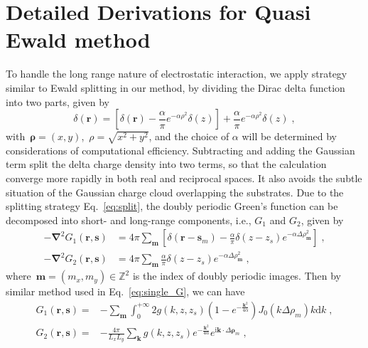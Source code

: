 \documentclass[aps,prl,reprint,showpacs,floatfix,superscriptaddress, onecolumn]{revtex4-2}
\newcommand{\V}[1]{\boldsymbol{#1}} %
\newcommand{\M}[1]{\boldsymbol{#1}} %
\renewcommand{\d}[1]{\delta#1} %
\newcommand{\grad}{\M{\nabla}} %
\begin{document}
\section{Detailed Derivations for Quasi Ewald method}

To handle the long range nature of electrostatic interaction, we apply strategy similar to Ewald splitting in our method, by dividing the Dirac delta function into two parts, given by
\begin{equation}\label{eq:split}
    \delta(\V r) = \left[\d(\V r) - \frac{\alpha}{\pi} e^{-\alpha \rho^2}\d(z)\right] + \frac{\alpha}{\pi} e^{-\alpha \rho^2}\d(z)\;,
\end{equation}
with~$\V{\rho} = (x, y)$,~$\rho = \sqrt{x^2+y^2}$, and the choice of $\alpha$ will be determined by considerations of computational efficiency.
Subtracting and adding the Gaussian term split the delta charge density into two terms, so that the calculation converge more rapidly in both real and reciprocal spaces.
It also avoids the subtle situation of the Gaussian charge cloud overlapping the substrates.
Due to the splitting strategy Eq.~\eqref{eq:split}, the doubly periodic Green's function can be decomposed into short- and long-range components, i.e., $G_1$ and $G_2$, given by
\begin{equation} \label{eq:G12}
    \begin{split}
        -\grad^2 G_1(\V r, \V s) &= 4 \pi \sum_{\V{m}} \left[\d(\V r - \V s_m) - \frac{\alpha}{\pi} \d(z - z_s) e^{-\alpha \Delta \rho_{\V{m}}^2} \right]\;,\\
    	-\grad^2 G_2(\V r, \V s) &= 4 \pi \sum_{\V{m}} \frac{\alpha}{\pi} \d(z - z_s) e^{-\alpha \Delta \rho_{\V{m}}^2}\;,
    \end{split}
\end{equation}
where~$\V{m} = (m_x, m_y) \in \mathbb{Z}^2$ is the index of doubly periodic images.
Then by similar method used in Eq.~\eqref{eq:single_G}, we can have
\begin{equation}\label{eq:G12_int}
    \begin{split}
        G_1(\V r, \V s)
        = & - \sum_{\V{m}} \int_{0}^{+\infty} 2 g(k, z, z_s) (1-e^{-\frac{\V{k}^2}{4 \alpha}}) J_0(k \Delta \rho_m) k \text{d} k \;, \\
        G_2(\V r, \V s)
        = & - \frac{4 \pi}{L_x L_y} \sum_{\V{k}} g(k, z, z_s) e^{-\frac{\V{k}^2}{4 \alpha}}e^{\mathrm{i} \V{k} \cdot \Delta \V \rho_m}\;,
    \end{split}
\end{equation}
\end{document}
